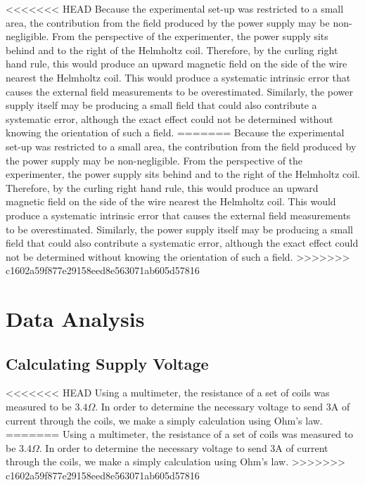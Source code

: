 \documentclass[a4paper]{article}
\begin{document}
<<<<<<< HEAD
Because the experimental set-up was restricted to a small area, the
contribution from the field produced by the power supply may be
non-negligible. From the perspective of the experimenter, the power
supply sits behind and to the right of the Helmholtz coil. Therefore,
by the curling right hand rule, this would produce an upward magnetic
field on the side of the wire nearest the Helmholtz coil. This would
produce a systematic intrinsic error that causes the external field
measurements to be overestimated. Similarly, the power supply itself
may be producing a small field that could also contribute a systematic
error, although the exact effect could not be determined without
knowing the orientation of such a field.
=======
\qq Because the experimental set-up was restricted to a small area, the contribution
from the field produced by the power supply may be non-negligible. From the
perspective of the experimenter, the power supply sits behind and to the right
of the Helmholtz coil. Therefore, by the curling right hand rule, this would
produce an upward magnetic field on the side of the wire nearest the Helmholtz
coil. This would produce a systematic intrinsic error that causes the external
field measurements to be overestimated. Similarly, the power supply itself may
be producing a small field that could also contribute a systematic error,
although the exact effect could not be determined without knowing the
orientation of such a field.
>>>>>>> c1602a59f877e29158eed8e563071ab605d57816

\section{Data Analysis}


\subsection{Calculating Supply Voltage}

<<<<<<< HEAD
Using a multimeter, the resistance of a set of coils was measured to
be $3.4 \Omega$. In order to determine the necessary voltage to send
3A of current through the coils, we make a simply calculation using
Ohm's law.
=======
\qq Using a multimeter, the resistance of a set of coils was measured to be
$3.4 \Omega$. In order to determine the necessary voltage to send 3A of current
through the coils, we make a simply calculation using Ohm's law.
>>>>>>> c1602a59f877e29158eed8e563071ab605d57816
\end{document}
